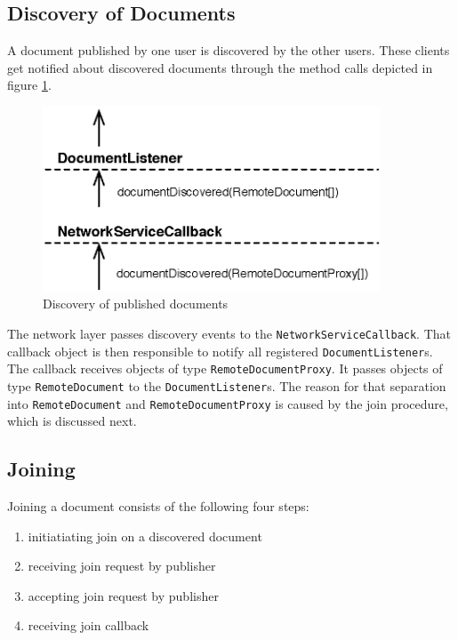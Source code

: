 \subsection{Discovery of Documents}
\label{sect:archoverview.flow.discovery}
A document published by one user is discovered by the other users. These
clients get notified about discovered documents through the method calls
depicted in figure \ref{fig:archoverview.flow.discovery}.

\begin{figure}[H]
 \centering
 \includegraphics[width=10.05cm,height=5.50cm]{../images/finalreport/architecture_flows/discovery.eps}
 \caption{Discovery of published documents}
 \label{fig:archoverview.flow.discovery}
\end{figure}

The network layer passes discovery events to the 
\texttt{Network\-Service\-Callback}. That callback object is then responsible
to notify all registered \texttt{Document\-Listener}s. The callback receives
objects of type \texttt{Remote\-Documen\-tProxy}. It passes objects of type
\texttt{Remote\-Document} to the \texttt{Document\-Listener}s. The reason
for that separation into \texttt{Remote\-Document} and 
\texttt{Remote\-Document\-Proxy} is caused by the join procedure, which is
discussed next.


\subsection{Joining}
Joining a document consists of the following four steps:
\begin{enumerate}
 \item initiatiating join on a discovered document
 \item receiving join request by publisher
 \item accepting join request by publisher
 \item receiving join callback
\end{enumerate}

